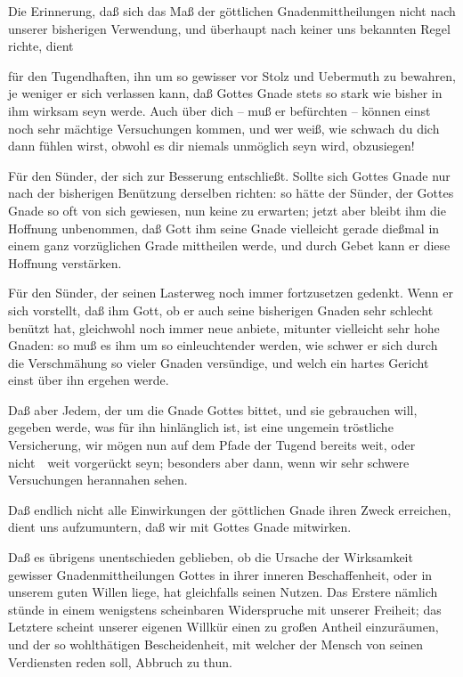 \begin{aufza}
\item Die Erinnerung, daß sich das Maß der göttlichen Gnadenmittheilungen nicht nach unserer bisherigen Verwendung, und überhaupt nach keiner uns bekannten Regel richte, dient
\begin{aufzb}
\item für den Tugendhaften, ihn um so gewisser vor Stolz und Uebermuth zu bewahren, je weniger er sich verlassen kann, daß Gottes Gnade stets so stark wie bisher in ihm wirksam seyn werde. Auch über dich -- muß er befürchten -- können einst noch sehr mächtige Versuchungen kommen, und wer weiß, wie schwach du dich dann fühlen wirst, obwohl es dir niemals unmöglich seyn wird, obzusiegen!
\item Für den Sünder, der sich zur Besserung entschließt. Sollte sich Gottes Gnade nur nach der bisherigen Benützung derselben richten: so hätte der Sünder, der Gottes Gnade so oft von sich gewiesen, nun keine zu erwarten; jetzt aber bleibt ihm die Hoffnung unbenommen, daß Gott ihm seine Gnade vielleicht gerade dießmal in einem ganz vorzüglichen Grade mittheilen werde, und durch Gebet kann er diese Hoffnung verstärken.
\item Für den Sünder, der seinen Lasterweg noch immer fortzusetzen gedenkt. Wenn er sich vorstellt, daß ihm Gott, ob er auch seine bisherigen Gnaden sehr schlecht benützt hat, gleichwohl noch immer neue anbiete, mitunter vielleicht sehr hohe Gnaden: so muß es ihm um so einleuchtender werden, wie schwer er sich durch die Verschmähung so vieler Gnaden versündige, und welch ein hartes Gericht einst über ihn ergehen werde.
\end{aufzb}
\item Daß aber Jedem, der um die Gnade Gottes bittet, und sie gebrauchen will, gegeben werde, was für ihn hinlänglich ist, ist eine ungemein tröstliche Versicherung, wir mögen nun auf dem Pfade der Tugend bereits weit, oder nicht~\ weit vorgerückt seyn; besonders aber dann, wenn wir sehr schwere Versuchungen herannahen sehen.
\item Daß endlich nicht alle Einwirkungen der göttlichen Gnade ihren Zweck erreichen, dient uns aufzumuntern, daß wir mit Gottes Gnade mitwirken.
\end{aufza}
\begin{RWanm} Daß es übrigens unentschieden geblieben, ob die Ursache der Wirksamkeit gewisser Gnadenmittheilungen Gottes in ihrer inneren Beschaffenheit, oder in unserem guten Willen liege, hat gleichfalls seinen Nutzen. Das Erstere nämlich stünde in einem wenigstens scheinbaren Widerspruche mit unserer Freiheit; das Letztere scheint unserer eigenen Willkür einen zu großen Antheil einzuräumen, und der so wohlthätigen Bescheidenheit, mit welcher der Mensch von seinen Verdiensten reden soll, Abbruch zu thun. 
\end{RWanm}

